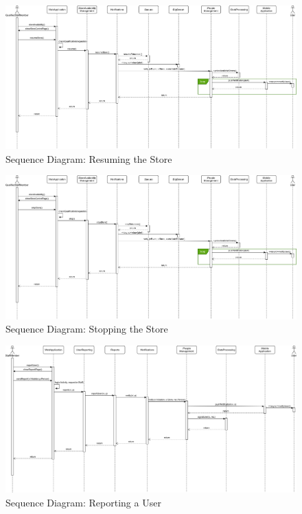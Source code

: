 \begin{landscape}

\begin{figure}[H]
	\includegraphics[width=\linewidth]{../Diagrams/Sequence/sequence_store_resume.png}
	\caption{Sequence Diagram: Resuming the Store}
	\label{fig:sStoreRes}
\end{figure}

\begin{figure}[H]
	\includegraphics[width=\linewidth]{../Diagrams/Sequence/sequence_store_override.png}
	\caption{Sequence Diagram: Stopping the Store}
	\label{fig:sStoreOver}
\end{figure}

\begin{figure}[H]
	\includegraphics[width=\linewidth]{../Diagrams/Sequence/sequence_user_report.png}
	\caption{Sequence Diagram: Reporting a User}
	\label{fig:sUserRep}
\end{figure}


\end{landscape}
